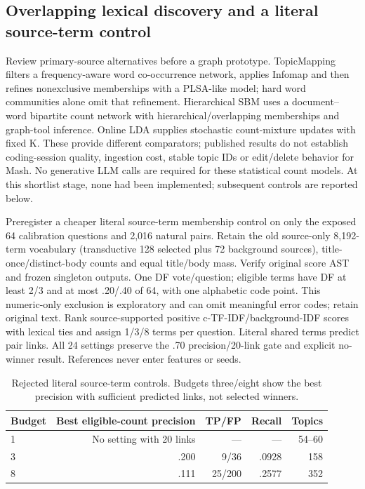 \documentclass[11pt]{article}
\begin{document}
\subsection{Overlapping lexical discovery and a literal source-term control}
Review primary-source alternatives before a graph prototype. TopicMapping
filters a frequency-aware word co-occurrence network, applies Infomap and then
refines nonexclusive memberships with a PLSA-like model\cite{topicmapping};
hard word communities alone omit that refinement. Hierarchical SBM uses a
document--word bipartite count network with hierarchical/overlapping memberships
and graph-tool inference\cite{networktopics}. Online LDA supplies stochastic
count-mixture updates with fixed K\cite{onlinelda}. These provide different
comparators; published results do not establish coding-session quality, ingestion
cost, stable topic IDs or edit/delete behavior for Mash. No generative LLM calls
are required for these statistical count models. At this shortlist stage,
none had been implemented; subsequent controls are reported below.

Preregister a cheaper literal source-term membership control on only the exposed
64 calibration questions and 2,016 natural pairs. Retain the old source-only
8,192-term vocabulary (transductive 128 selected plus 72 background sources),
title-once/distinct-body counts and equal title/body mass. Verify original score
AST and frozen singleton outputs. One DF vote/question; eligible terms have DF
at least 2/3 and at most .20/.40 of 64, with one alphabetic code point. This
numeric-only exclusion is exploratory and can omit meaningful error codes;
retain original text. Rank source-supported positive c-TF-IDF/background-IDF
scores with lexical ties and assign 1/3/8 terms per question. Literal shared
terms predict pair links. All 24 settings preserve the .70 precision/20-link
gate and explicit no-winner result. References never enter features or seeds.

\begin{table}[ht]
\centering\small
\begin{tabular}{lrrrr}
\toprule
Budget & Best eligible-count precision & TP/FP & Recall & Topics\\
\midrule
1 & No setting with 20 links & --- & --- & 54--60\\
3 & .200 & 9/36 & .0928 & 158\\
8 & .111 & 25/200 & .2577 & 352\\
\bottomrule
\end{tabular}
\caption{Rejected literal source-term controls. Budgets three/eight show the
best precision with sufficient predicted links, not selected winners.}
\end{table}
\end{document}
